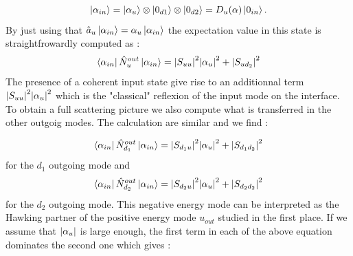 \begin{equation}
    \ket{\alpha_{in}}=\ket{\alpha_u}\otimes\ket{0_{d1}}\otimes\ket{0_{d2}} = D_u(\alpha)\ket{0_{in}}.
\end{equation}
By just using that $\hat{a}_u\ket{\alpha_{in}}=\alpha_u\ket{\alpha_{in}}$ the expectation value in this state is straightfrowardly computed as :
\begin{equation}
    \bra{\alpha_{in}}\hat{N}_u^{out}\ket{\alpha_{in}} = \abs{S_{uu}}^2\abs{\alpha_u}^2 + \abs{S_{ud_2}}^2
    \label{eq:stimulated_expectation_value}
\end{equation}
The presence of a coherent input state give rise to an additionnal term $\abs{S_{uu}}^2\abs{\alpha_u}^2$ which is the "classical" reflexion of the input mode on the interface.
To obtain a full scattering picture we also compute what is transferred in the other outgoig modes. The calculation are similar and we find :

\begin{equation}
    \bra{\alpha_{in}}\hat{N}_{d_1}^{out}\ket{\alpha_{in}} = \abs{S_{d_1u}}^2\abs{\alpha_u}^2 + \abs{S_{d_1d_2}}^2
    \label{eq:d1_stimulated_expectation_value}
\end{equation}
for the $d_1$ outgoing mode and 
\begin{equation}
    \bra{\alpha_{in}}\hat{N}_{d_2}^{out}\ket{\alpha_{in}} = \abs{S_{d_2u}}^2\abs{\alpha_u}^2 + \abs{S_{d_2d_2}}^2
    \label{eq:d2_stimulated_expectation_value}
\end{equation}
for the $d_2$ outgoing mode. This negative energy mode can be interpreted as the Hawking partner of the positive energy mode $u_{out}$ studied in the first place.
If we assume that $\abs{\alpha_u}$ is large enough, the first term in each of the above equation dominates the second one which gives :

